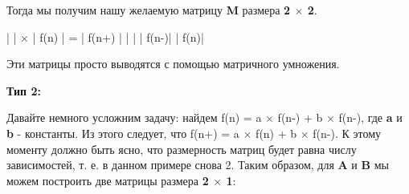 \vspace{\baselineskip}
Тогда мы получим нашу желаемую матрицу \textbf{M} размера \textbf{2 $\times$ 2}.

\vspace{\baselineskip}
\begin{tcolorbox}
|\hspace{1,5mm} \hspace{6mm}\hspace{1,5mm}|\hspace{3mm} $\times$ \hspace{3mm}| \hspace{3mm} f(n) \hspace{3mm}|\hspace{3mm}  = \hspace{3mm} |\hspace*{2,5mm} f(n+)\hspace*{2,9mm} |\newline
|\hspace{1,5mm} \hspace{6mm}\hspace{0,1mm} |\hspace*{10,7mm}     |\hspace*{2,5mm} f(n-)\hspace*{2,9mm}| \hspace*{10,5mm}    |\hspace*{6mm} f(n)\hspace*{6mm}|
\end{tcolorbox}

\vspace{\baselineskip}
Эти матрицы просто выводятся с помощью матричного умножения.

\vspace{\baselineskip}

\textbf{Тип 2:}

\vspace{\baselineskip}
Давайте немного усложним задачу: найдем f(n) = a $\times$ f(n-) + b $\times$ f(n-), где \textbf{a} и \textbf{b} - константы.\newline
Из этого следует, что f(n+) = a $\times$ f(n) + b $\times$ f(n-).\newline 
К этому моменту должно быть ясно, что размерность матриц будет равна числу зависимостей, т. е. в данном примере снова 2. Таким образом, для \textbf{A} и \textbf{B} мы можем построить две матрицы размера \textbf{2 $\times$ 1}:

